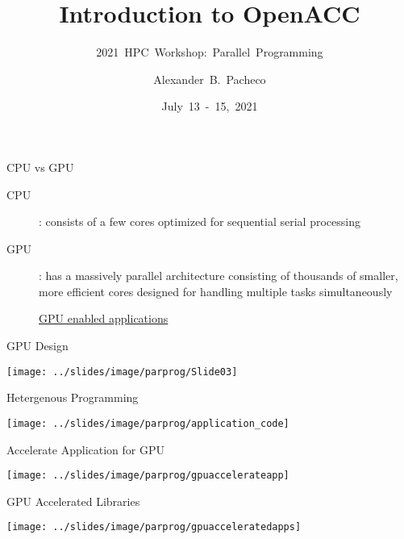 \documentclass[10pt,t]{beamer}
\title{Introduction to OpenACC}
\subtitle{2021~HPC~Workshop:~Parallel~Programming}
\author{\large{Alexander~B.~Pacheco}}
\institute[Lehigh University Research Computing]{\href{http://researchcomputing.lehigh.edu}{Research~Computing}}
\date{July~13~-~15,~2021}
\begin{document}
\begin{frame}
  \titlepage
\end{frame}

\begin{frame}{CPU vs GPU}
  \begin{description}
    \item[CPU]: consists of a few cores optimized for sequential serial processing
    \item[GPU]: has a massively parallel architecture consisting of thousands of smaller, more efficient cores designed for handling multiple tasks simultaneously
    \item[] \href{http://www.nvidia.com/object/gpu-applications.html}{GPU enabled applications}
  \end{description}
\end{frame}

\begin{frame}{GPU Design}
  \vspace{0.25cm}
  \begin{center}
    \texttt{[image: ../slides/image/parprog/Slide03]}
  \end{center}
\end{frame}

\begin{frame}{Hetergenous Programming}
  \begin{center}
    \texttt{[image: ../slides/image/parprog/application\_code]}
  \end{center}
\end{frame}

\begin{frame}{Accelerate Application for GPU}
  \begin{center}
    \texttt{[image: ../slides/image/parprog/gpuaccelerateapp]}
  \end{center}
\end{frame}

\begin{frame}{GPU Accelerated Libraries}
  \begin{center}
    \texttt{[image: ../slides/image/parprog/gpuacceleratedapps]}
  \end{center}
\end{frame}
\end{document}

